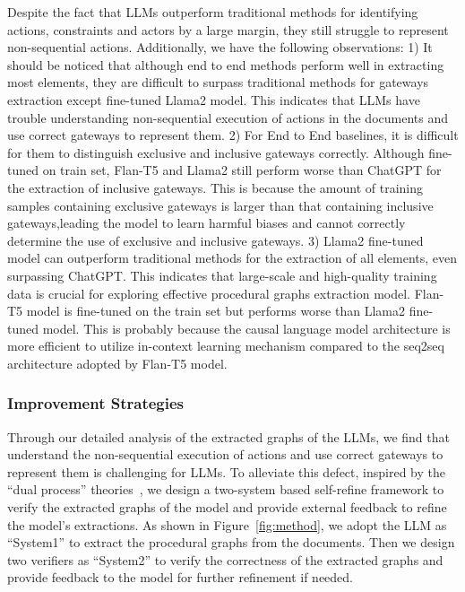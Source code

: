 Despite the fact that LLMs outperform traditional methods for identifying actions, constraints and actors by a large margin, they still struggle to represent non-sequential actions. 
Additionally, we have the following observations:
1) It should be noticed that although end to end methods perform well in extracting most elements, they are difficult to surpass traditional methods for gateways extraction except fine-tuned Llama2 model. This indicates that LLMs have trouble understanding non-sequential execution of actions in the documents and use correct gateways to represent them. 
2) For End to End baselines, it is difficult for them to distinguish exclusive and inclusive gateways correctly. Although fine-tuned on train set, Flan-T5 and Llama2 still perform worse than ChatGPT for the extraction of inclusive gateways. This is because the amount of training samples containing exclusive gateways is larger than that containing inclusive gateways,leading the model to learn harmful biases and cannot correctly determine the use of exclusive and inclusive gateways. 
3) Llama2 fine-tuned model can outperform traditional methods for the extraction of all elements, even surpassing ChatGPT. This indicates that large-scale and high-quality training data is crucial for exploring effective procedural graphs extraction model. Flan-T5 model is fine-tuned on the train set but performs worse than Llama2 fine-tuned model. This is probably because the causal language model architecture is more efficient to utilize in-context learning mechanism compared to the seq2seq architecture adopted by Flan-T5 model. 

\subsubsection{Improvement Strategies}
Through our detailed analysis of the extracted graphs of the LLMs, we find that understand the non-sequential execution of actions and use correct gateways to represent them is challenging for LLMs. 
To alleviate this defect, inspired by the ``dual process'' theories~\cite{evans2003two}, we design a two-system based self-refine framework to verify the extracted graphs of the model and provide external feedback to refine the model's extractions. 
As shown in Figure~\ref{fig:method}, we adopt the LLM as ``System1'' to extract the procedural graphs from the documents. Then we design two verifiers as ``System2'' to verify the correctness of the extracted graphs and provide feedback to the model for further refinement if needed. 


